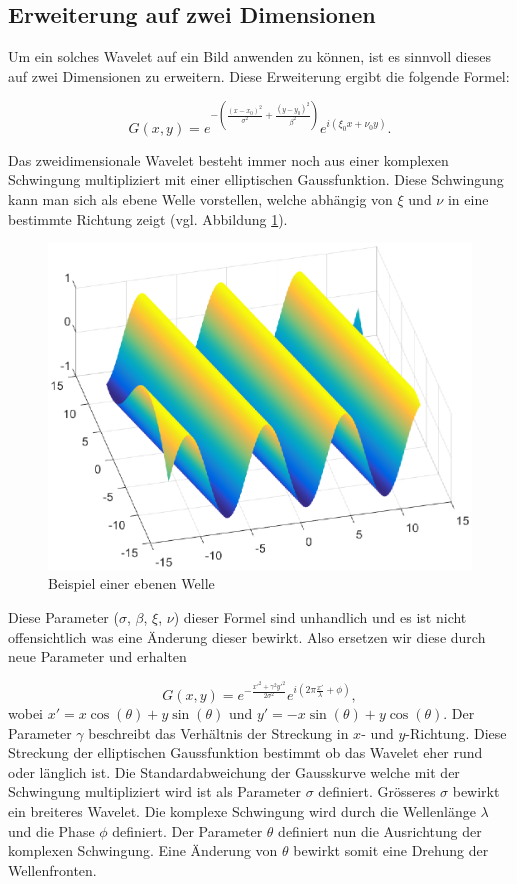 \subsection{Erweiterung auf zwei Dimensionen}

Um ein solches Wavelet auf ein Bild anwenden zu können, ist es sinnvoll dieses auf zwei Dimensionen zu erweitern.
Diese Erweiterung ergibt die folgende Formel:

\begin{equation}
G(x,y)= e^{-(\frac{(x-x_{0})^{2}}{\sigma^{2}}+\frac{(y-y_{0})^{2}}{\beta^{2}})}
e^{i(\xi_{0}x+\nu_{0}y)}.
\end{equation}

Das zweidimensionale Wavelet besteht immer noch aus einer komplexen Schwingung multipliziert mit einer elliptischen Gaussfunktion. 
Diese Schwingung kann man sich als ebene Welle vorstellen, welche abhängig von $\xi$ und $\nu$ in eine bestimmte Richtung zeigt (vgl. Abbildung \ref{fig:planarwave}).

\begin{figure}
	\centering
	\includegraphics[width=0.7\linewidth]{./papers/visuell/images/planarwave.eps}
	\caption{Beispiel einer ebenen Welle}
	\label{fig:planarwave}
\end{figure}



Diese Parameter ($\sigma$, $\beta$, $\xi$, $\nu$) dieser Formel sind unhandlich und es ist nicht offensichtlich was eine Änderung dieser bewirkt.
Also ersetzen wir diese durch neue Parameter und erhalten 

\begin{equation}
G(x,y)=e^{-\frac{x'^{2}+\gamma^{2}y'^{2}}{2\sigma^{2}}}
e^{i(2\pi\frac{x'}{\lambda} + \phi)},
\end{equation} 
wobei $x'=x\cos(\theta)+y\sin(\theta)$ und $y'=-x\sin(\theta)+y\cos(\theta)$.
Der Parameter $\gamma$ beschreibt das Verhältnis der Streckung in $x$- und $y$-Richtung.
Diese Streckung der elliptischen Gaussfunktion bestimmt ob das Wavelet eher rund oder länglich ist.
Die Standardabweichung der Gausskurve welche mit der Schwingung multipliziert wird ist als Parameter $\sigma$ definiert.
Grösseres $\sigma$ bewirkt ein breiteres Wavelet.
Die komplexe Schwingung wird durch die Wellenlänge $\lambda$ und die Phase $\phi$ definiert.
Der Parameter $\theta$ definiert nun die Ausrichtung der komplexen Schwingung.
Eine Änderung von $\theta$  bewirkt somit eine Drehung der Wellenfronten.

